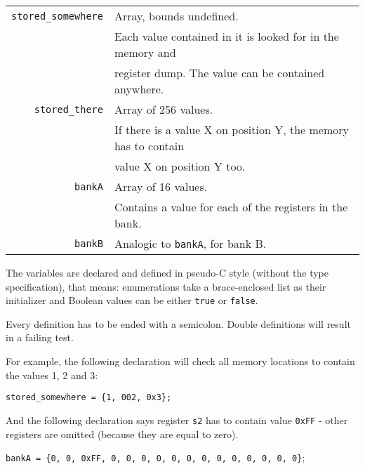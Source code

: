             \begin{center}
            \begin{tabular}{ r | l }
                \texttt{stored\_somewhere} & Array, bounds undefined. \\
                & Each value contained in it is looked for in the memory and \\
                & register dump. The value can be contained anywhere. \\

                \texttt{stored\_there} & Array of 256 values. \\
                & If there is a value X on position Y, the memory has to contain \\
                & value X on position Y too. \\

                \texttt{bankA} & Array of 16 values. \\
                & Contains a value for each of the registers in the bank. \\

                \texttt{bankB} & Analogic to \texttt{bankA}, for bank B.

            \end{tabular}
            \end{center}

            The variables are declared and defined in pseudo-C style (without the type specification), that means: enumerations take a brace-enclosed list as their initializer and Boolean values can be either \texttt{true} or \texttt{false}.

            Every definition has to be ended with a semicolon. Double definitions will result in a failing test.

            For example, the following declaration will check all memory locations to contain the values 1, 2 and 3:

            \begin{center}
                \texttt{stored\_somewhere = \{1, 002, 0x3\};}
            \end{center}

            And the following declaration says register \texttt{s2} has to contain value \texttt{0xFF} - other registers are omitted (because they are equal to zero).

            \begin{center}
                \texttt{bankA = \{0, 0, 0xFF, 0, 0, 0, 0, 0, 0, 0, 0, 0, 0, 0, 0, 0\}};
            \end{center}

